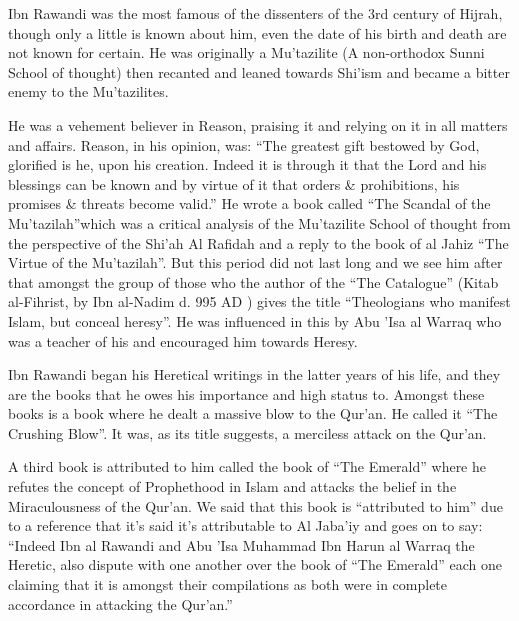\documentclass[12pt]{book}
\begin{document}
Ibn Rawandi was the most famous of the dissenters of the 3rd century of Hijrah,
though only a little is known about him, even the date of his birth and death
are not known for certain. He was originally a Mu’tazilite (A non-orthodox
Sunni School of thought) then recanted and leaned towards Shi’ism and became
a bitter enemy to the Mu’tazilites.

He was a vehement believer in Reason, praising it and relying on it in all
matters and affairs. Reason, in his opinion, was: “The greatest gift bestowed
by God, glorified is he, upon his creation. Indeed it is through it that the
Lord and his blessings can be known and by virtue of it that orders \&
prohibitions, his promises \& threats become valid.”\footnotemark
He wrote a book called “The Scandal of the Mu’tazilah”\footnotemark which was a
critical analysis of the Mu’tazilite School of thought from the perspective of
the Shi’ah Al Rafidah and a reply to the book of al Jahiz “The Virtue of the
Mu’tazilah”. But this period did not last long and we see him after that
amongst the group of those who the author of the “The Catalogue” (Kitab
al-Fihrist, by Ibn al-Nadim d. 995 AD ) gives the title “Theologians who
manifest Islam, but conceal heresy”. He was influenced in this by Abu ’Isa al
Warraq who was a teacher of his and encouraged him towards Heresy.


Ibn Rawandi began his Heretical writings in the latter years of his life, and
they are the books that he owes his importance and high status to. Amongst
these books is a book where he dealt a massive blow to the Qur’an. He called it
“The Crushing Blow”. It was, as its title suggests, a merciless attack on the
Qur’an.

A third book is attributed to him called the book of “The Emerald” where he
refutes the concept of Prophethood in Islam and attacks the belief in the
Miraculousness of the Qur’an. We said that this book is “attributed to him” due
to a reference that it’s said it’s attributable to Al Jaba’iy and goes on to
say: “Indeed Ibn al Rawandi and Abu ’Isa Muhammad Ibn Harun al Warraq the
Heretic, also dispute with one another over the book of “The Emerald” each one
claiming that it is amongst their compilations as both were in complete
accordance in attacking the Qur’an.”\footnotemark
\end{document}
